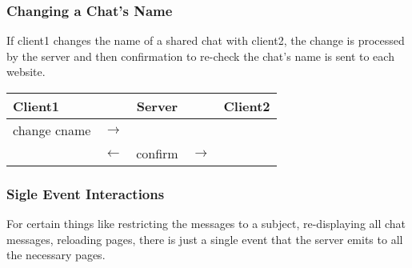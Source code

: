 \documentclass[12pt]{article}
\begin{document}
\subsubsection*{Changing a Chat's Name}
If client1 changes the name of a shared chat with client2, the
change is processed by the server and then confirmation to re-check
the chat's name is sent to each website.
\begin{center}
  \begin{tabular}{lcccr}
    Client1 && Server && Client2\\
    \hline
    change cname & $\rightarrow$& &&\\
    & $\leftarrow$ & confirm & $\rightarrow$&
  \end{tabular}
\end{center}

\subsubsection*{Sigle Event Interactions}
For certain things like restricting the messages to a subject,
re-displaying all chat messages, reloading pages, there is just a
single event that the server emits to all the necessary pages.
\end{document}
